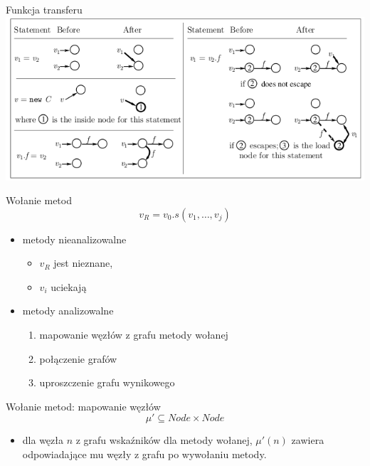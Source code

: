 \documentclass[handout]{beamer}
\begin{document}
\begin{frame}{Funkcja transferu}
  \includegraphics[width=\columnwidth]{img/transfer.png}
\end{frame}

\begin{frame}{Wołanie metod}
  $$v_R = v_0.s(v_1, \dots, v_j)$$
  \begin{itemize}
    \item<1-> metody nieanalizowalne
      \begin{itemize}
        \item $v_R$ jest nieznane, 
        \item $v_i$ uciekają
      \end{itemize}
    \item<2-> metody analizowalne
      \begin{enumerate}
        \item mapowanie węzłów z grafu metody wołanej
        \item połączenie grafów
        \item uproszczenie grafu wynikowego
      \end{enumerate}
  \end{itemize}
\end{frame}

\begin{frame}{Wołanie metod: mapowanie węzłów}
  $$\mu' \subseteq Node \times Node$$
  \begin{itemize}
  \item dla węzła $n$ z grafu wskaźników dla metody wołanej, $\mu'(n)$
    zawiera odpowiadające mu węzły z grafu po wywołaniu metody.
  \end{itemize}
\end{frame}
\end{document}
